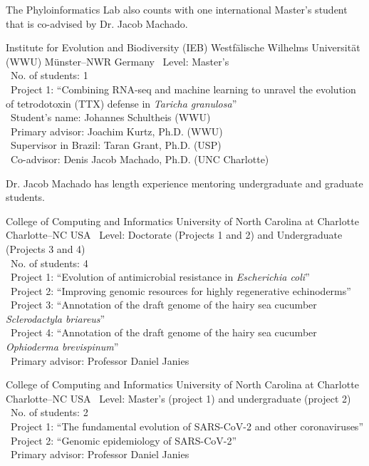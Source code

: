 \documentclass[11pt, letterpaper, sans]{moderncv}
\begin{document}
The Phyloinformatics Lab also counts with one international Master's student that is co-advised by Dr. Jacob Machado.

\vspace{.5em}

{Institute for Evolution and Biodiversity (IEB)}
{Westfälische Wilhelms Universität (WWU)}
{Münster--NWR}
{Germany}
{
	\textbullet~Level: Master's\\
	\textbullet~No. of students: 1\\
	\textbullet~Project 1: ``Combining RNA-seq and machine learning to unravel the evolution of tetrodotoxin (TTX) defense in \textit{Taricha granulosa}''\\
	\textbullet~Student's name: Johannes Schultheis (WWU)\\
	\textbullet~Primary advisor: Joachim Kurtz, Ph.D. (WWU)\\
	\textbullet~Supervisor in Brazil: Taran Grant, Ph.D. (USP)\\
	\textbullet~Co-advisor: Denis Jacob Machado, Ph.D. (UNC Charlotte)\\
}

Dr. Jacob Machado has length experience mentoring undergraduate and graduate students.

\vspace{.5em}

{College of Computing and Informatics}
{University of North Carolina at Charlotte}
{Charlotte--NC}
{USA}
{
	\textbullet~Level: Doctorate (Projects 1 and 2) and Undergraduate (Projects 3 and 4)\\
	\textbullet~No. of students: 4\\
	\textbullet~Project 1: ``Evolution of antimicrobial resistance in \textit{Escherichia coli}''\\
	\textbullet~Project 2: ``Improving genomic resources for highly regenerative echinoderms''\\
	\textbullet~Project 3: ``Annotation of the draft genome of the hairy sea cucumber \textit{Sclerodactyla briareus}''\\
	\textbullet~Project 4: ``Annotation of the draft genome of the hairy sea cucumber \textit{Ophioderma brevispinum}''\\
	\textbullet~Primary advisor: Professor Daniel Janies\\
}

{College of Computing and Informatics}
{University of North Carolina at Charlotte}
{Charlotte--NC}
{USA}
{
	\textbullet~Level: Master's (project 1) and undergraduate (project 2)\\
	\textbullet~No. of students: 2\\
	\textbullet~Project 1: ``The  fundamental evolution of SARS-CoV-2 and other coronaviruses''\\
	\textbullet~Project 2: ``Genomic epidemiology of SARS-CoV-2''\\
	\textbullet~Primary advisor: Professor Daniel Janies\\
}
\end{document}
